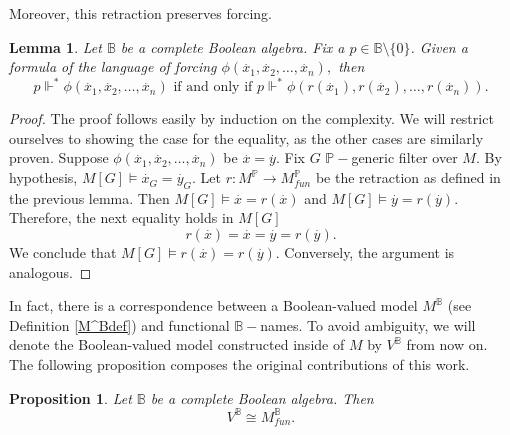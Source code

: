 \documentclass[10pt,longbibliography]{article}
\newtheorem{Prop}[Theo]{Proposition}
\newtheorem{Lemma}[Theo]{Lemma}
\newcommand{\Po}{\mathbb{P}}
\newcommand{\B}{\mathbb{B}}
\newcommand{\ydot}{\overset{.}{y}}
\newcommand{\xdot}{\overset{.}{x}}
\newcommand{\forces}{\Vdash^{*}}
\begin{document}
Moreover, this retraction preserves forcing.

\begin{Lemma}\label{retractionpreservesforcing}
	Let $\B$ be a complete Boolean algebra. Fix a $p \in \B \setminus \{0\}$. Given a formula of the language of forcing $\phi(\xdot_{1},\xdot_{2}, \dots, \xdot_{n}),$ then
	$$ p\forces \phi(\xdot_{1},\xdot_{2}, \dots ,\xdot_{n}) \text{ if and only if } p \forces \phi(r(\xdot_{1}),r(\xdot_{2}),\dots,r(\xdot_{n})).$$
\end{Lemma}
\begin{proof}
	The proof follows easily by induction on the complexity. We will restrict ourselves to showing the case for the equality, as the other cases are similarly proven. Suppose $\phi(\xdot_{1},\xdot_{2},\dots,\xdot_{n })$ be $\xdot = \ydot$. Fix $G$ $\Po-$generic filter over $M$. By hypothesis, $M[G] \models \xdot_{G
	} = \ydot_{G}$. Let $r : M^{\Po} \to M^{\Po}_{fun}$ be the retraction as defined in the previous lemma. Then $M[G] \models \xdot = r(\xdot)$ and $M[G] \models \ydot = r(\ydot)$. Therefore, the next equality holds in $M[G]$
	$$r(\xdot) = \xdot = \ydot = r(\ydot).$$
	We conclude that $M[G] \models r(\xdot) = r(\ydot).$ Conversely, the argument is analogous. 
\end{proof}

In fact, there is a correspondence between a Boolean-valued model $M^\B$ {(see Definition \ref{M^Bdef})} and functional $\B-$names. To avoid ambiguity, we will denote the Boolean-valued model constructed inside of $M$ by $V^\B$ from now on. The following proposition composes the original contributions of this work.
\begin{Prop}\label{VBandfuncionalnames}
	Let $\B$ be a complete Boolean algebra. Then 
	$$V^{\B} \cong M^{\B}_{fun}.$$
\end{Prop}
\end{document}
